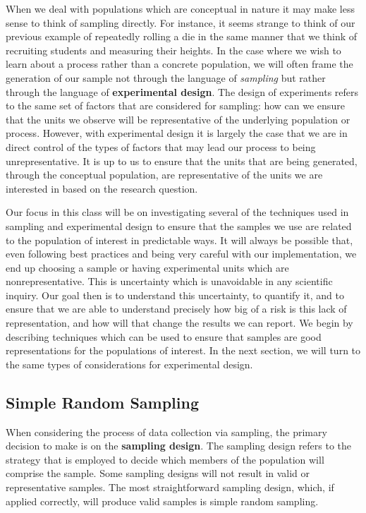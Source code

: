 \documentclass[
  letterpaper,
  DIV=11,
  numbers=noendperiod]{scrreprt}
\theoremstyle{definition}
\theoremstyle{definition}
\theoremstyle{definition}
\theoremstyle{remark}
\begin{document}
When we deal with populations which are conceptual in nature it may make
less sense to think of sampling directly. For instance, it seems strange
to think of our previous example of repeatedly rolling a die in the same
manner that we think of recruiting students and measuring their heights.
In the case where we wish to learn about a process rather than a
concrete population, we will often frame the generation of our sample
not through the language of \emph{sampling} but rather through the
language of \textbf{experimental design}. The design of experiments
refers to the same set of factors that are considered for sampling: how
can we ensure that the units we observe will be representative of the
underlying population or process. However, with experimental design it
is largely the case that we are in direct control of the types of
factors that may lead our process to being unrepresentative. It is up to
us to ensure that the units that are being generated, through the
conceptual population, are representative of the units we are interested
in based on the research question.

Our focus in this class will be on investigating several of the
techniques used in sampling and experimental design to ensure that the
samples we use are related to the population of interest in predictable
ways. It will always be possible that, even following best practices and
being very careful with our implementation, we end up choosing a sample
or having experimental units which are nonrepresentative. This is
uncertainty which is unavoidable in any scientific inquiry. Our goal
then is to understand this uncertainty, to quantify it, and to ensure
that we are able to understand precisely how big of a risk is this lack
of representation, and how will that change the results we can report.
We begin by describing techniques which can be used to ensure that
samples are good representations for the populations of interest. In the
next section, we will turn to the same types of considerations for
experimental design.

\subsection{Simple Random Sampling}\label{simple-random-sampling}

When considering the process of data collection via sampling, the
primary decision to make is on the \textbf{sampling design}. The
sampling design refers to the strategy that is employed to decide which
members of the population will comprise the sample. Some sampling
designs will not result in valid or representative samples. The most
straightforward sampling design, which, if applied correctly, will
produce valid samples is simple random sampling.
\end{document}
